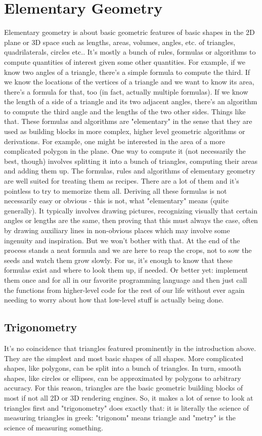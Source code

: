 \section{Elementary Geometry}
Elementary geometry is about basic geometric features of basic shapes in the 2D plane or 3D space such as lengths, areas, volumes, angles, etc. of triangles, quadrilaterals, circles etc.. It's mostly a bunch of rules, formulas or algorithms to compute quantities of interest given some other quantities. For example, if we know two angles of a triangle, there's a simple formula to compute the third. If we know the locations of the vertices of a triangle and we want to know its area, there's a formula for that, too (in fact, actually multiple formulas). If we know the length of a side of a triangle and its two adjacent angles, there's an algorithm to compute the third angle and the lengths of the two other sides. Things like that. These formulas and algorithms are "elementary" in the sense that they are used as building blocks in more complex, higher level geometric algorithms or derivations. For example, one might be interested in the area of a more complicated polygon in the plane. One way to compute it (not necessarily the best, though) involves splitting it into a bunch of triangles, computing their areas and adding them up. The formulas, rules and algorithms of elementary geometry are well suited for treating them as recipes. There are a lot of them and it's pointless to try to memorize them all. Deriving all these formulas is not necessarily easy or obvious - this is not, what "elementary" means (quite generally). It typically involves drawing pictures, recognizing visually that certain angles or lengths are the same, then proving that this must always the case, often by drawing auxiliary lines in non-obvious places which may involve some ingenuity and inspiration. But we won't bother with that. At the end of the process stands a neat formula and we are here to reap the crops, not to sow the seeds and watch them grow slowly. For us, it's enough to know that these formulas exist and where to look them up, if needed. Or better yet: implement them once and for all in our favorite programming language and then just call the functions from higher-level code for the rest of our life without ever again needing to worry about how that low-level stuff is actually being done. 

\subsection{Trigonometry}
It's no coincidence that triangles featured prominently in the introduction above. They are the simplest and most basic shapes of all shapes. More complicated shapes, like polygons, can be split into a bunch of triangles. In turn, smooth shapes, like circles or ellipses, can be approximated by polygons to arbitrary accuracy. For this reason, triangles are the basic geometric building blocks of most if not all 2D or 3D rendering engines. So, it makes a lot of sense to look at triangles first and "trigonometry" does exactly that: it is literally the science of measuring triangles in greek: "trigonom" means triangle and "metry" is the science of measuring something.

